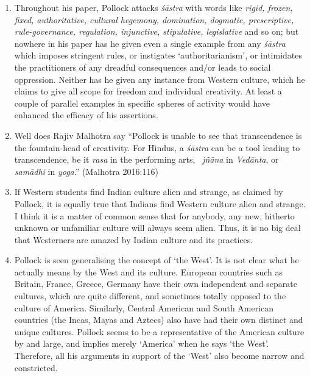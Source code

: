 \begin{enumerate}
\item Throughout his paper, Pollock attacks {\it śāstra} with words like \textsl{rigid, frozen, fixed, authoritative, cultural hegemony, domination, dogmatic, prescriptive, rule-governance, regulation, injunctive, stipulative, legislative} and so on; but nowhere in his paper has he given even a single example from any {\it śāstra} which imposes stringent rules, or instigates `authoritarianism', or intimidates the practitioners of any dreadful consequences and/or leads to social oppression. Neither has he given any instance from Western culture, which he claims to give all scope for freedom and individual creativity. At least a couple of parallel examples in specific spheres of activity would have enhanced the efficacy of his assertions.

\item Well does Rajiv Malhotra say ``Pollock is unable to see that transcendence is the fountain-head of creativity. For Hindus, a {\it śāstra} can be a tool leading to transcendence, be it {\it rasa} in the performing arts, \ {\it jñāna} in {\it Vedānta}, or {\it samādhi} in {\it yoga}.'' (Malhotra 2016:116)

\item If Western students find Indian culture alien and strange, as claimed by Pollock, it is equally true that Indians find Western culture alien and strange. I think it is a matter of common sense that for anybody, any new, hitherto unknown or unfamiliar culture will always seem alien. Thus, it is no big deal that Westerners are amazed by Indian culture and its practices.

\item Pollock is seen generalising the concept of `the West'. It is not clear what he actually means by the West and its culture. European countries such as Britain, France, Greece, Germany have their own independent and separate cultures, which are quite different, and sometimes totally opposed to the culture of America. Similarly, Central American and South American countries (the Incas, Mayas and Aztecs) also have had their own distinct and unique cultures. Pollock seems to be a representative of the American culture by and large, and implies merely `America' when he says `the West'. Therefore, all his arguments in support of the `West' also become narrow and constricted. 
\end{enumerate}

